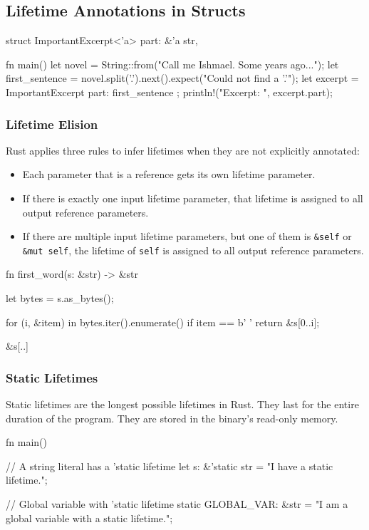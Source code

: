 \documentclass[8pt,a4paper,twocolumn]{extarticle}
\begin{document}
\subsection{Lifetime Annotations in Structs}
\begin{Code}
    struct ImportantExcerpt<'a> {
        part: &'a str,
    }
    
    fn main() {
        let novel = String::from("Call me Ishmael. Some years ago...");
        let first_sentence = novel.split('.').next().expect("Could not find a '.'");
        let excerpt = ImportantExcerpt { part: first_sentence };
        println!("Excerpt: {}", excerpt.part);
    }
\end{Code}

\subsubsection{Lifetime Elision}
Rust applies three rules to infer lifetimes when they are not explicitly annotated:
\begin{itemize}
    \item Each parameter that is a reference gets its own lifetime parameter.
    \item If there is exactly one input lifetime parameter, that lifetime is assigned to all output
    reference parameters.
    \item If there are multiple input lifetime parameters, but one of them is \texttt{\&self} or \texttt{\&mut self}, the lifetime of \texttt{self} is assigned to all output reference parameters.
\end{itemize}
\begin{Code}
    fn first_word(s: &str) -> &str {
        let bytes = s.as_bytes();
    
        for (i, &item) in bytes.iter().enumerate() {
            if item == b' ' {
                return &s[0..i];
            }
        }
    
        &s[..]
    }
\end{Code}

\subsubsection{Static Lifetimes}

Static lifetimes are the longest possible lifetimes in Rust. They last for the entire duration of the program. They are stored in the binary's read-only memory.

\begin{Code}
    fn main() {

        // A string literal has a 'static lifetime
        let s: &'static str = "I have a static lifetime.";


        // Global variable with 'static lifetime
        static GLOBAL_VAR: &str = "I am a global variable with a static lifetime.";

    }
\end{Code}
\end{document}
